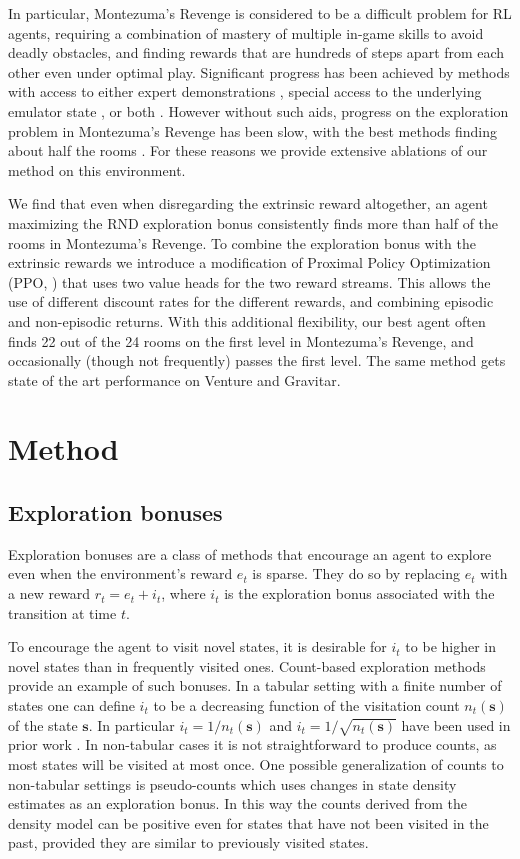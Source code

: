 \documentclass{article} \usepackage[dvipsnames]{xcolor}
\begin{document}
In particular, Montezuma's Revenge is considered to be a difficult problem for RL agents, requiring a combination of mastery of multiple in-game skills to avoid deadly obstacles, and finding rewards that are hundreds of steps apart from each other even under optimal play. Significant progress has been achieved by methods with access to either expert demonstrations \citep{pohlen2018observe,aytar2018playing,garmulewicz2018expert}, special access to the underlying emulator state \citep{tang2016exploration,stanton2018deep}, or both \citep{salimans2018mz}. However without such aids, progress on the exploration problem in Montezuma's Revenge has been slow, with the best methods finding about half the rooms \citep{bellemare2016unifying}. For these reasons we provide extensive ablations of our method on this environment.

We find that even when disregarding the extrinsic reward altogether, an agent maximizing the RND exploration bonus consistently finds more than half of the rooms in Montezuma's Revenge. To combine the exploration bonus with the extrinsic rewards we introduce a modification of Proximal Policy Optimization (PPO, \cite{ppo}) that uses two value heads for the two reward streams. This allows the use of different discount rates for the different rewards, and combining episodic and non-episodic returns. With this additional flexibility, our best agent often finds 22 out of the 24 rooms on the first level in Montezuma's Revenge, and occasionally (though not frequently) passes the first level. The same method gets state of the art performance on Venture and Gravitar.
\section{Method}
\subsection{Exploration bonuses}
\label{sec:method}
Exploration bonuses are a class of methods that encourage an agent to explore even when the environment's reward $e_t$ is sparse. They do so by replacing $e_t$ with a new reward $r_t=e_t+i_t$, where $i_t$ is the exploration bonus associated with the transition at time $t$.

To encourage the agent to visit novel states, it is desirable for $i_t$ to be higher in novel states than in frequently visited ones. Count-based exploration methods provide an example of such bonuses. In a tabular setting with a finite number of states one can define $i_t$ to be a decreasing function of the visitation count $n_t({\bm{s}})$ of the state ${\bm{s}}$. In particular $i_t = 1/n_t({\bm{s}})$ and $i_t = 1/\sqrt{n_t({\bm{s}})}$ have been used in prior work \citep{bellemare2016unifying, neuralcount}. In non-tabular cases it is not straightforward to produce counts, as most states will be visited at most once. One possible generalization of counts to non-tabular settings is pseudo-counts \citep{bellemare2016unifying} which uses changes in state density estimates as an exploration bonus. In this way the counts derived from the density model can be positive even for states that have not been visited in the past, provided they are similar to previously visited states.
\end{document}
